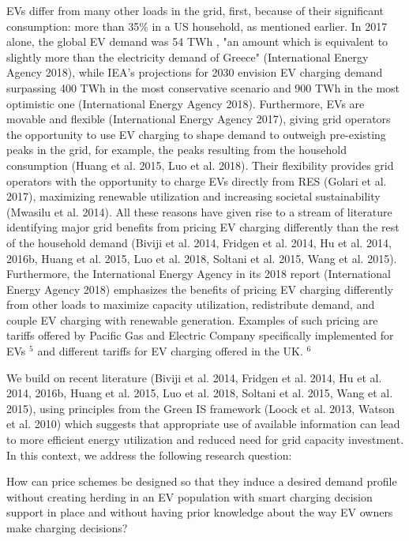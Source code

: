 \documentclass[10pt]{article}
\begin{document}
EVs differ from many other loads in the grid, first, because of their significant consumption: more than 35\% in a US household, as mentioned earlier. In 2017 alone, the global EV demand was 54 TWh , "an amount which is equivalent to slightly more than the electricity demand of Greece" (International Energy Agency 2018), while IEA's projections for 2030 envision EV charging demand surpassing 400 TWh in the most conservative scenario and 900 TWh in the most optimistic one (International Energy Agency 2018). Furthermore, EVs are movable and flexible (International Energy Agency 2017), giving grid operators the opportunity to use EV charging to shape demand to outweigh pre-existing peaks in the grid, for example, the peaks resulting from the household consumption (Huang et al. 2015, Luo et al. 2018). Their flexibility provides grid operators with the opportunity to charge EVs directly from RES (Golari et al. 2017), maximizing renewable utilization and increasing societal sustainability (Mwasilu et al. 2014). All these reasons have given rise to a stream of literature identifying major grid benefits from pricing EV charging differently than the rest of the household demand (Biviji et al. 2014, Fridgen et al. 2014, Hu et al. 2014, 2016b, Huang et al. 2015, Luo et al. 2018, Soltani et al. 2015, Wang et al. 2015). Furthermore, the International Energy Agency in its 2018 report (International Energy Agency 2018) emphasizes the benefits of pricing EV charging differently from other loads to maximize capacity utilization, redistribute demand, and couple EV charging with renewable generation. Examples of such pricing are tariffs offered by Pacific Gas and Electric Company specifically implemented for EVs ${ }^{5}$ and different tariffs for EV charging offered in the UK. ${ }^{6}$

We build on recent literature (Biviji et al. 2014, Fridgen et al. 2014, Hu et al. 2014, 2016b, Huang et al. 2015, Luo et al. 2018, Soltani et al. 2015, Wang et al. 2015), using principles from the Green IS framework (Loock et al. 2013, Watson et al. 2010) which suggests that appropriate use of available information can lead to more efficient energy utilization and reduced need for grid capacity investment. In this context, we address the following research question:

How can price schemes be designed so that they induce a desired demand profile without creating herding in an EV population with smart charging decision support in place and without having prior knowledge about the way EV owners make charging decisions?
\end{document}
